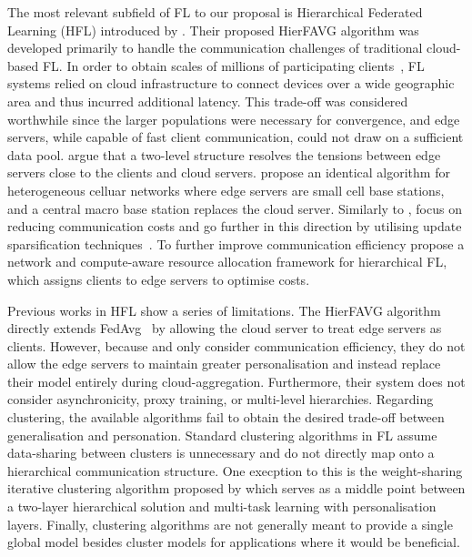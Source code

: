 The most relevant subfield of FL to our proposal is Hierarchical Federated Learning (HFL) introduced by \citet{Client-Edge-CloudHierFL}. Their proposed HierFAVG algorithm was developed primarily to handle the communication challenges of traditional cloud-based FL\@. In order to obtain scales of millions of participating clients~\citep{GoogleKeyboard, ScaleSystemDesign}, FL systems relied on cloud infrastructure to connect devices over a wide geographic area and thus incurred additional latency. This trade-off was considered worthwhile since the larger populations were necessary for convergence, and edge servers, while capable of fast client communication, could not draw on a sufficient data pool. \citet{Client-Edge-CloudHierFL} argue that a two-level structure resolves the tensions between edge servers close to the clients and cloud servers. \citet{Hier_Het_Cellular} propose an identical algorithm for heterogeneous celluar networks where edge servers are small cell base stations, and a central macro base station replaces the cloud server. Similarly to \citet{Client-Edge-CloudHierFL}, \citet{Hier_Het_Cellular} focus on reducing communication costs and go further in this direction by utilising update sparsification techniques~\citep{DeepGradientCompressin,CommCompressionDecent}. To further improve communication efficiency \citet{HFELJointEdgeResource} propose a network and compute-aware resource allocation framework for hierarchical FL, which assigns clients to edge servers to optimise costs.


Previous works in HFL show a series of limitations. The HierFAVG algorithm directly extends FedAvg~\citep{FedAvg} by allowing the cloud server to treat edge servers as clients. However, because \citet{Client-Edge-CloudHierFL} and \citet{Hier_Het_Cellular} only consider communication efficiency, they do not allow the edge servers to maintain greater personalisation and instead replace their model entirely during cloud-aggregation. Furthermore, their system does not consider asynchronicity, proxy training, or multi-level hierarchies. Regarding clustering, the available algorithms fail to obtain the desired trade-off between generalisation and personation. Standard clustering algorithms in FL assume data-sharing between clusters is unnecessary and do not directly map onto a hierarchical communication structure. One execption to this is the weight-sharing iterative clustering algorithm proposed by \citet{AnEfficientFrameworkForClusteredFL} which serves as a middle point between a two-layer hierarchical solution and multi-task learning with personalisation layers. Finally, clustering algorithms are not generally meant to provide a single global model besides cluster models for applications where it would be beneficial.


